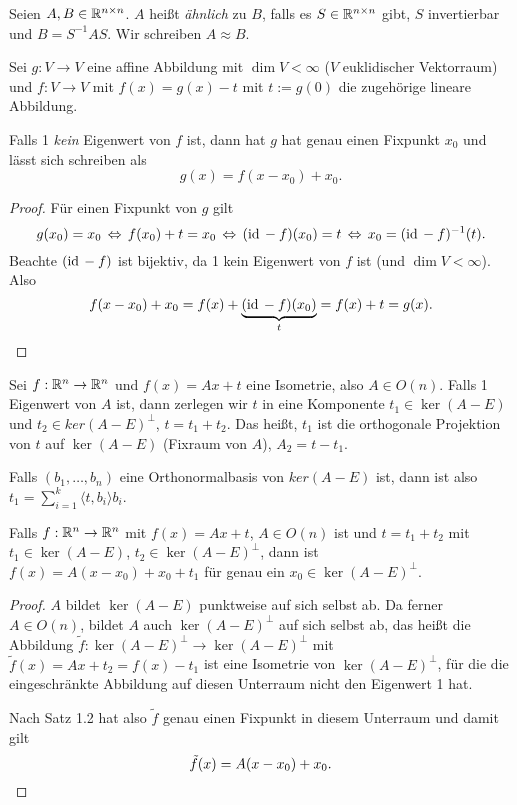 \begin{mydef}[Ähnlichkeitsbegriff]
 Seien $A, B \in \mathbb{R}^{n \times n}$. $A$ heißt \emph{ähnlich} zu $B$, falls es $S \in \mathbb{R}^{n \times n}$ gibt, $S$ invertierbar und $B = S^{-1} A S$. Wir schreiben $A \approx B$.
\end{mydef}

\begin{thm}
 Sei $g: V \to V$ eine affine Abbildung mit $\dim V < \infty$ ($V$ euklidischer Vektorraum) und $f: V \to V$ mit $f(x) = g(x) - t$ mit $t := g(0)$ die zugehörige lineare Abbildung.
 
 Falls 1 \emph{kein} Eigenwert von $f$ ist, dann hat $g$ hat genau einen Fixpunkt $x_0$ und lässt sich schreiben als\footnotemark
 \[ g(x) = f(x-x_0) + x_0. \]
\end{thm}

\begin{proof}
 Für einen Fixpunkt von $g$ gilt
 \[ g(x_0) = x_0 \,\Leftrightarrow\, f(x_0) + t = x_0 \,\Leftrightarrow\, (\mathrm{id}\, - f)(x_0) = t \,\Leftrightarrow\, x_0 = (\mathrm{id}\, - f)^{-1}(t). \]
 Beachte $(\mathrm{id}\, -f)$ ist bijektiv, da 1 kein Eigenwert von $f$ ist (und $\dim V < \infty$). Also
 \[ f(x - x_0) + x_0 = f(x) + \underbrace{(\mathrm{id}\,-f)(x_0)}_{t} = f(x) + t = g(x). \]
\end{proof}

Sei $f:\mathbb{R}^n \to \mathbb{R}^n$ und $f(x) = Ax + t$ eine Isometrie, also $A \in O(n)$. Falls 1 Eigenwert von $A$ ist, dann zerlegen wir $t$ in eine Komponente $t_1 \in \ker(A-E)$ und $t_2 \in ker(A-E)^\bot$, $t = t_1 + t_2$. Das heißt, $t_1$ ist die orthogonale Projektion von $t$ auf $\ker(A-E)$ (Fixraum von $A$), $A_2 = t - t_1$.

\begin{bem}
 Falls $(b_1, \ldots, b_n)$ eine Orthonormalbasis von $ker(A-E)$ ist, dann ist also $t_1 = \sum_{i=1}^k \langle t, b_i \rangle b_i$.
\end{bem}

\begin{thm}
 Falls $f: \mathbb{R}^n \to \mathbb{R}^n$ mit $f(x) = Ax + t$, $A \in O(n)$ ist und $t = t_1 + t_2$ mit $t_1 \in \ker(A-E)$, $t_2 \in \ker(A-E)^\bot$, dann ist $f(x) = A(x-x_0) + x_0 + t_1$ für genau ein $x_0 \in \ker(A-E)^\bot$.
\end{thm}

\begin{proof}
 $A$ bildet $\ker(A-E)$ punktweise auf sich selbst ab. Da ferner $A \in O(n)$, bildet $A$ auch $\ker(A-E)^\bot$ auf sich selbst ab, das heißt die Abbildung $\tilde{f}: \ker(A-E)^\bot \to \ker(A-E)^\bot$ mit $\tilde{f}(x) = Ax + t_2 = f(x) - t_1$ ist eine Isometrie von $\ker(A-E)^\bot$, für die die eingeschränkte Abbildung auf diesen Unterraum nicht den Eigenwert 1 hat.
 
 Nach Satz 1.2 hat also $\tilde{f}$ genau einen Fixpunkt in diesem Unterraum und damit gilt
 \[ \tilde{f}(x) = A(x-x_0) + x_0. \qedhere \]
\end{proof}

